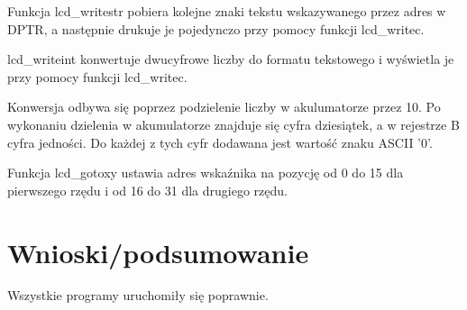 \documentclass[12pt,a4paper]{article}
\begin{document}
		\begin{minipage}{.5\textwidth}
			
		\end{minipage}%
		\begin{minipage}{.5\textwidth}
			\vspace{1cm}
			Funkcja lcd\_writestr pobiera kolejne znaki tekstu wskazywanego przez adres w DPTR, a następnie drukuje je pojedynczo przy pomocy funkcji lcd\_writec.
			\vspace{4cm}

			lcd\_writeint konwertuje dwucyfrowe liczby do formatu tekstowego i wyświetla je przy pomocy funkcji lcd\_writec.

			Konwersja odbywa się poprzez podzielenie liczby w akulumatorze przez 10.
			Po wykonaniu dzielenia w akumulatorze znajduje się cyfra dziesiątek, a w rejestrze B cyfra jedności.
			Do każdej z tych cyfr dodawana jest wartość znaku ASCII '0'.
			\vspace{2cm}

			Funkcja lcd\_gotoxy ustawia adres wskaźnika na pozycję od 0 do 15 dla pierwszego rzędu i od 16 do 31 dla drugiego rzędu.
			\vspace{8cm}
		\end{minipage}

	\section{Wnioski/podsumowanie}
	
			Wszystkie programy uruchomiły się poprawnie.
	
\end{document}
